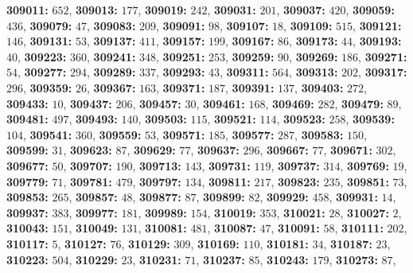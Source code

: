 \textsf{\bfseries 309011:} $652$, \textsf{\bfseries 309013:} $177$, \textsf{\bfseries 309019:} $242$, \textsf{\bfseries 309031:} $201$, \textsf{\bfseries 309037:} $420$, \textsf{\bfseries 309059:} $436$, \textsf{\bfseries 309079:} $47$, \textsf{\bfseries 309083:} $209$, \textsf{\bfseries 309091:} $98$, \textsf{\bfseries 309107:} $18$, \textsf{\bfseries 309109:} $515$, \textsf{\bfseries 309121:} $146$, \textsf{\bfseries 309131:} $53$, \textsf{\bfseries 309137:} $411$, \textsf{\bfseries 309157:} $199$, \textsf{\bfseries 309167:} $86$, \textsf{\bfseries 309173:} $44$, \textsf{\bfseries 309193:} $40$, \textsf{\bfseries 309223:} $360$, \textsf{\bfseries 309241:} $348$, \textsf{\bfseries 309251:} $253$, \textsf{\bfseries 309259:} $90$, \textsf{\bfseries 309269:} $186$, \textsf{\bfseries 309271:} $54$, \textsf{\bfseries 309277:} $294$, \textsf{\bfseries 309289:} $337$, \textsf{\bfseries 309293:} $43$, \textsf{\bfseries 309311:} $564$, \textsf{\bfseries 309313:} $202$, \textsf{\bfseries 309317:} $296$, \textsf{\bfseries 309359:} $26$, \textsf{\bfseries 309367:} $163$, \textsf{\bfseries 309371:} $187$, \textsf{\bfseries 309391:} $137$, \textsf{\bfseries 309403:} $272$, \textsf{\bfseries 309433:} $10$, \textsf{\bfseries 309437:} $206$, \textsf{\bfseries 309457:} $30$, \textsf{\bfseries 309461:} $168$, \textsf{\bfseries 309469:} $282$, \textsf{\bfseries 309479:} $89$, \textsf{\bfseries 309481:} $497$, \textsf{\bfseries 309493:} $140$, \textsf{\bfseries 309503:} $115$, \textsf{\bfseries 309521:} $114$, \textsf{\bfseries 309523:} $258$, \textsf{\bfseries 309539:} $104$, \textsf{\bfseries 309541:} $360$, \textsf{\bfseries 309559:} $53$, \textsf{\bfseries 309571:} $185$, \textsf{\bfseries 309577:} $287$, \textsf{\bfseries 309583:} $150$, \textsf{\bfseries 309599:} $31$, \textsf{\bfseries 309623:} $87$, \textsf{\bfseries 309629:} $77$, \textsf{\bfseries 309637:} $296$, \textsf{\bfseries 309667:} $77$, \textsf{\bfseries 309671:} $302$, \textsf{\bfseries 309677:} $50$, \textsf{\bfseries 309707:} $190$, \textsf{\bfseries 309713:} $143$, \textsf{\bfseries 309731:} $119$, \textsf{\bfseries 309737:} $314$, \textsf{\bfseries 309769:} $19$, \textsf{\bfseries 309779:} $71$, \textsf{\bfseries 309781:} $479$, \textsf{\bfseries 309797:} $134$, \textsf{\bfseries 309811:} $217$, \textsf{\bfseries 309823:} $235$, \textsf{\bfseries 309851:} $73$, \textsf{\bfseries 309853:} $265$, \textsf{\bfseries 309857:} $48$, \textsf{\bfseries 309877:} $87$, \textsf{\bfseries 309899:} $82$, \textsf{\bfseries 309929:} $458$, \textsf{\bfseries 309931:} $14$, \textsf{\bfseries 309937:} $383$, \textsf{\bfseries 309977:} $181$, \textsf{\bfseries 309989:} $154$, \textsf{\bfseries 310019:} $353$, \textsf{\bfseries 310021:} $28$, \textsf{\bfseries 310027:} $2$, \textsf{\bfseries 310043:} $151$, \textsf{\bfseries 310049:} $131$, \textsf{\bfseries 310081:} $481$, \textsf{\bfseries 310087:} $47$, \textsf{\bfseries 310091:} $58$, \textsf{\bfseries 310111:} $202$, \textsf{\bfseries 310117:} $5$, \textsf{\bfseries 310127:} $76$, \textsf{\bfseries 310129:} $309$, \textsf{\bfseries 310169:} $110$, \textsf{\bfseries 310181:} $34$, \textsf{\bfseries 310187:} $23$, \textsf{\bfseries 310223:} $504$, \textsf{\bfseries 310229:} $23$, \textsf{\bfseries 310231:} $71$, \textsf{\bfseries 310237:} $85$, \textsf{\bfseries 310243:} $179$, \textsf{\bfseries 310273:} $87$, 

